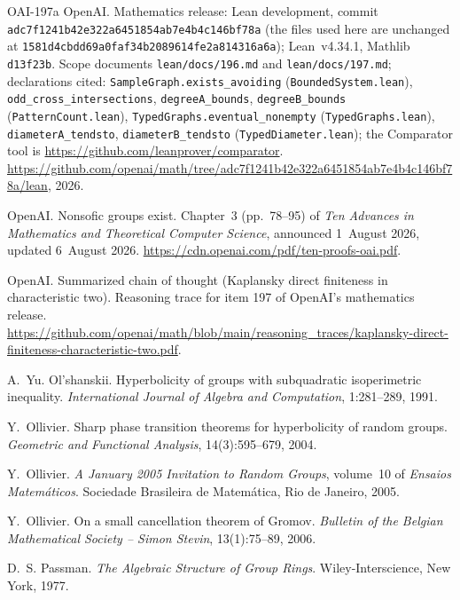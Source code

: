 \documentclass[11pt]{article}
\theoremstyle{definition}
\theoremstyle{plain}
\begin{document}
\begin{thebibliography}{OAI-197a}
OpenAI.
\newblock Mathematics release: Lean development, commit \texttt{adc7f1241b42e322a6451854ab7e4b4c146bf78a} (the files used here are unchanged at \texttt{1581d4cbdd69a0faf34b2089614fe2a814316a6a}); Lean~v4.34.1, Mathlib \texttt{d13f23b}. Scope documents \texttt{lean/docs/196.md} and \texttt{lean/docs/197.md}; declarations cited: \texttt{SampleGraph.exists\_avoiding} (\texttt{BoundedSystem.lean}), \texttt{odd\_cross\_intersections}, \texttt{degreeA\_bounds}, \texttt{degreeB\_bounds} (\texttt{PatternCount.lean}), \texttt{TypedGraphs.eventual\_nonempty} (\texttt{TypedGraphs.lean}), \texttt{diameterA\_tendsto}, \texttt{diameterB\_tendsto} (\texttt{TypedDiameter.lean}); the Comparator tool is \url{https://github.com/leanprover/comparator}.
\newblock \url{https://github.com/openai/math/tree/adc7f1241b42e322a6451854ab7e4b4c146bf78a/lean}, 2026.

OpenAI.
\newblock Nonsofic groups exist.
\newblock Chapter~3 (pp.~78--95) of \emph{Ten Advances in Mathematics and Theoretical Computer Science}, announced 1~August 2026, updated 6~August 2026. \url{https://cdn.openai.com/pdf/ten-proofs-oai.pdf}.

OpenAI.
\newblock Summarized chain of thought (Kaplansky direct finiteness in characteristic two).
\newblock Reasoning trace for item 197 of OpenAI's mathematics release. \url{https://github.com/openai/math/blob/main/reasoning_traces/kaplansky-direct-finiteness-characteristic-two.pdf}.

A.~Yu. Ol'shanskii.
\newblock Hyperbolicity of groups with subquadratic isoperimetric inequality.
\newblock \emph{International Journal of Algebra and Computation}, 1:281--289, 1991.

Y.~Ollivier.
\newblock Sharp phase transition theorems for hyperbolicity of random groups.
\newblock \emph{Geometric and Functional Analysis}, 14(3):595--679, 2004.

Y.~Ollivier.
\newblock \emph{A January 2005 Invitation to Random Groups}, volume~10 of \emph{Ensaios Matem\'aticos}.
\newblock Sociedade Brasileira de Matem\'atica, Rio de Janeiro, 2005.

Y.~Ollivier.
\newblock On a small cancellation theorem of Gromov.
\newblock \emph{Bulletin of the Belgian Mathematical Society -- Simon Stevin}, 13(1):75--89, 2006.

D.~S. Passman.
\newblock \emph{The Algebraic Structure of Group Rings}.
\newblock Wiley-Interscience, New York, 1977.


\end{thebibliography}
\end{document}

